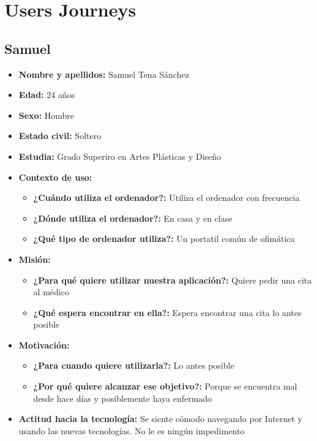 \chapter{Users Journeys}\label{anexo}

\section{Samuel}

\begin{itemize}
    \item \textbf{Nombre y apellidos: } Samuel Tena Sánchez
    \item \textbf{Edad: } 24 años
    \item \textbf{Sexo: } Hombre
    \item \textbf{Estado civil: } Soltero
    \item \textbf{Estudia: } Grado Superiro en Artes Plásticas y Diseño
    \item \textbf{Contexto de uso: } 
    \begin{itemize}
        \item \textbf{¿Cuándo utiliza el ordenador?: }  Utiliza el ordenador con frecuencia
        \item \textbf{¿Dónde utiliza el ordenador?: } En casa y en clase 
        \item \textbf{¿Qué tipo de ordenador utiliza?: } Un portatil común de ofimática
    \end{itemize}
    \item \textbf{Misión: } 
    \begin{itemize}
        \item \textbf{¿Para qué quiere utilizar nuestra aplicación?: } Quiere pedir una cita al médico
        \item \textbf{¿Qué espera encontrar en ella?: } Espera encontrar una cita lo antes posible 
    \end{itemize}
    \item \textbf{Motivación: } 
    \begin{itemize}
        \item \textbf{¿Para cuando quiere utilizarla?: } Lo antes posible
        \item \textbf{¿Por qué quiere alcanzar ese objetivo?: } Porque se encuentra mal desde hace días y posiblemente haya enfermado
    \end{itemize}
    \item \textbf{Actitud hacia la tecnología: } Se siente cómodo navegando por Internet y usando las nuevas tecnologías. No le es ningún impedimento
    

\end{itemize}
